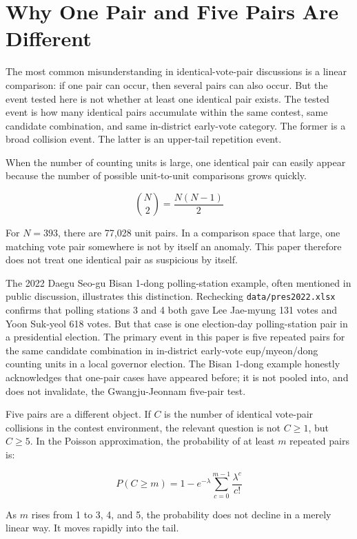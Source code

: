 \documentclass[preprint]{../ieie/IEIE}
\begin{document}
\section{Why One Pair and Five Pairs Are Different}

The most common misunderstanding in identical-vote-pair discussions is a linear comparison: if one pair can occur, then several pairs can also occur. But the event tested here is not whether at least one identical pair exists. The tested event is how many identical pairs accumulate within the same contest, same candidate combination, and same in-district early-vote category. The former is a broad collision event. The latter is an upper-tail repetition event.

When the number of counting units is large, one identical pair can easily appear because the number of possible unit-to-unit comparisons grows quickly.

\[
\binom{N}{2} = \frac{N(N-1)}{2}
\]

For \(N=393\), there are 77,028 unit pairs. In a comparison space that large, one matching vote pair somewhere is not by itself an anomaly. This paper therefore does not treat one identical pair as suspicious by itself.

The 2022 Daegu Seo-gu Bisan 1-dong polling-station example, often mentioned in public discussion, illustrates this distinction. Rechecking \texttt{data/pres2022.xlsx} confirms that polling stations 3 and 4 both gave Lee Jae-myung 131 votes and Yoon Suk-yeol 618 votes. But that case is one election-day polling-station pair in a presidential election. The primary event in this paper is five repeated pairs for the same candidate combination in in-district early-vote eup/myeon/dong counting units in a local governor election. The Bisan 1-dong example honestly acknowledges that one-pair cases have appeared before; it is not pooled into, and does not invalidate, the Gwangju-Jeonnam five-pair test.

Five pairs are a different object. If \(C\) is the number of identical vote-pair collisions in the contest environment, the relevant question is not \(C \ge 1\), but \(C \ge 5\). In the Poisson approximation, the probability of at least \(m\) repeated pairs is:

\[
P(C \ge m) = 1 - e^{-\lambda}\sum_{c=0}^{m-1}\frac{\lambda^c}{c!}
\]

As \(m\) rises from 1 to 3, 4, and 5, the probability does not decline in a merely linear way. It moves rapidly into the tail.
\end{document}

